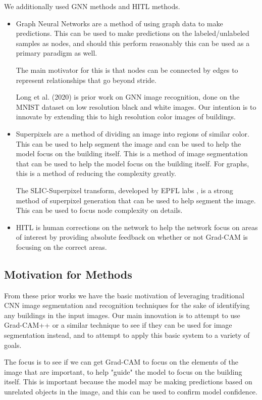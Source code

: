 \documentclass{article}
\begin{document}
We additionally used GNN methods and HITL methods. \begin{itemize}
    \item Graph Neural Networks are a method of using graph data to make predictions. This can be used to make predictions on the labeled/unlabeled samples as nodes, and should this perform reasonably this can be used as a primary paradigm as well. 
    
    The main motivator for this is that nodes can be connected by edges to represent relationships that go beyond stride.

    Long et al.\cite{long} (2020) is prior work on GNN image recognition, done on the MNIST dataset on low resolution black and white images. Our intention is to innovate by extending this to high resolution color images of buildings.

    \item Superpixels are a method of dividing an image into regions of similar color. This can be used to help segment the image and can be used to help the model focus on the building itself. This is a method of image segmentation that can be used to help the model focus on the building itself. For graphs, this is a method of reducing the complexity greatly. 

    The SLIC-Superpixel transform, developed by EPFL labs \cite{epflSLICSuperpixels}, is a strong method of superpixel generation that can be used to help segment the image. This can be used to focus node complexity on details.
    \item HITL is human corrections on the network to help the network focus on areas of interest by providing absolute feedback on whether or not Grad-CAM is focusing on the correct areas.
\end{itemize}

\subsection{Motivation for Methods}

From these prior works we have the basic motivation of leveraging traditional CNN image segmentation and recognition techniques for the sake of identifying any buildings in the input images. Our main innovation is to attempt to use Grad-CAM++ or a similar technique to see if they can be used for image segmentation instead, and to attempt to apply this basic system to a variety of goals.

The focus is to see if we can get Grad-CAM to focus on the elements of the image that are important, to help "guide" the model to focus on the building itself. This is important because the model may be making predictions based on unrelated objects in the image, and this can be used to confirm model confidence.
\end{document}
